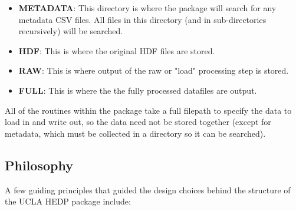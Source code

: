 \documentclass[12pt]{article}
\begin{document}
\begin{itemize}

\item \textbf{METADATA}: This directory is where the package will search for any metadata CSV files. All files in this directory (and in sub-directories recursively) will be searched. 

\item \textbf{HDF}: This is where the original HDF files are stored.

\item \textbf{RAW}: This is where output of the raw or "load" processing step is stored.

\item \textbf{FULL}: This is where the the fully processed datafiles are output.

\end{itemize}

All of the routines within the package take a full filepath to specify the data to load in and write out, so the data need not be stored together (except for metadata, which must be collected in a directory so it can be searched). 



\subsection{Philosophy}

A few guiding principles that guided the design choices behind the structure of the UCLA HEDP package include:
\end{document}
